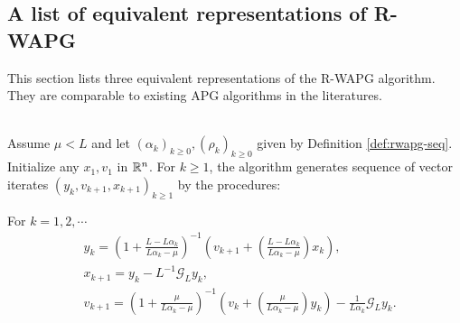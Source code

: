 \documentclass[12pt]{article}
\begin{document}
    \subsection{A list of equivalent representations of R-WAPG}
        This section lists three equivalent representations of the R-WAPG algorithm. 
        They are comparable to existing APG algorithms in the literatures. 
        \begin{definition}\label{def:r-wapg-intermediate}\;\\
            Assume $\mu < L$ and let $(\alpha_k)_{k \ge 0}, (\rho_k)_{k \ge 0}$ given by Definition \ref{def:rwapg-seq}. 
            Initialize any $x_1, v_1$ in $\mathbb R^n$. 
            For $k \ge 1$, the algorithm generates sequence of vector iterates $(y_{k}, v_{k + 1}, x_{k + 1})_{k \ge 1}$ by the procedures: 
            \begin{tcolorbox}
                For $k = 1, 2, \cdots$
                \begin{align*} 
                    & y_{k} = 
                    \left(
                        1 + \frac{L - L\alpha_{k}}{L\alpha_{k} - \mu}
                    \right)^{-1}
                    \left(
                        v_{k + 1} + 
                        \left(\frac{L - L\alpha_{k}}{L\alpha_{k} - \mu} \right) x_{k}
                    \right), 
                    \\
                    & x_{k + 1} = 
                    y_k - L^{-1} \mathcal G_L y_k, 
                    \\
                    & v_{k + 1} = 
                    \left(
                        1 + \frac{\mu}{L \alpha_k - \mu}
                    \right)^{-1}
                    \left(
                        v_k + 
                        \left(\frac{\mu}{L \alpha_k - \mu}\right) y_k
                    \right) - \frac{1}{L\alpha_{k}}\mathcal G_L y_k. 
                \end{align*}
            \end{tcolorbox}
        \end{definition}
\end{document}
